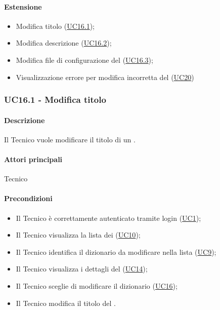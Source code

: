 \paragraph*{Estensione}
\begin{itemize}
  \item Modifica titolo  (\hyperref[UC16point1]{UC16.1});
  \item Modifica descrizione  (\hyperref[UC16point2]{UC16.2});
  \item Modifica file di configurazione del  (\hyperref[UC16point3]{UC16.3});
  \item Visualizzazione errore per modifica incorretta del  (\hyperref[UC20]{UC20})
\end{itemize}


\subsubsection{UC16.1 - Modifica titolo }\label{UC16point1}
\paragraph*{Descrizione}
Il Tecnico vuole modificare il titolo di un .

\paragraph*{Attori principali}
Tecnico

\paragraph*{Precondizioni}
\begin{itemize}
  \item Il Tecnico è correttamente autenticato tramite login (\hyperref[UC1]{UC1});
  \item Il Tecnico visualizza la lista dei  (\hyperref[UC10]{UC10});
  \item Il Tecnico identifica il dizionario da modificare nella lista (\hyperref[UC9]{UC9});
  \item Il Tecnico visualizza i dettagli del  (\hyperref[UC14]{UC14});
  \item Il Tecnico sceglie di modificare il dizionario (\hyperref[UC16]{UC16});
  \item Il Tecnico modifica il titolo del .
\end{itemize}

